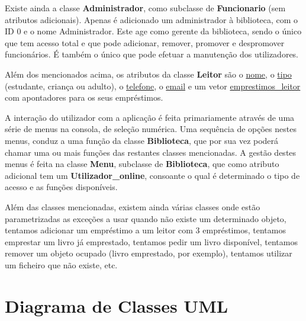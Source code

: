 \documentclass[12pt,a4paper,reqno]{report}
\numberwithin{figure}{section}
\numberwithin{equation}{section}
\begin{document}
Existe ainda a classe \textbf{Administrador}, como subclasse de \textbf{Funcionario} (sem atributos adicionais). Apenas é adicionado um administrador à biblioteca, com o ID 0 e o nome Administrador. Este age como gerente da biblioteca, sendo o único que tem acesso total e que pode adicionar, remover, promover e despromover funcionários. É também o único que pode efetuar a manutenção dos utilizadores.

Além dos mencionados acima, os atributos da classe \textbf{Leitor} são o \underline{nome}, o \underline{tipo} (estudante, criança ou adulto), o \underline{telefone}, o \underline{email} e um vetor \underline{emprestimos\_leitor} com apontadores para os seus empréstimos.

A interação do utilizador com a aplicação é feita primariamente através de uma série de menus na consola, de seleção numérica. Uma sequência de opções nestes menus, conduz a uma função da classe \textbf{Biblioteca}, que por sua vez poderá chamar uma ou mais funções das restantes classes mencionadas. A gestão destes menus é feita na classe \textbf{Menu}, subclasse de \textbf{Biblioteca}, que como atributo adicional tem um \textbf{Utilizador\_online}, consoante o qual é determinado o tipo de acesso e as funções disponíveis.

Além das classes mencionadas, existem ainda várias classes onde estão parametrizadas as exceções a usar quando não existe um determinado objeto, tentamos adicionar um empréstimo a um leitor com 3 empréstimos, tentamos emprestar um livro já emprestado, tentamos pedir um livro disponível, tentamos remover um objeto ocupado (livro emprestado, por exemplo), tentamos utilizar um ficheiro que não existe, etc.

\chapter{Diagrama de Classes UML}
\end{document}

